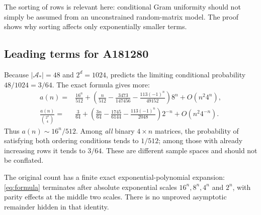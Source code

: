 \documentclass[11pt,letterpaper]{article}
\theoremstyle{definition}
\newcommand{\Astar}{\mathcal A_*}
\newcommand{\1}{\mathbf 1}
\begin{document}
The sorting of rows is relevant here: conditional Gram uniformity should not
simply be assumed from an unconstrained random-matrix model. The proof shows
why sorting affects only exponentially smaller terms.

\subsection{Leading terms for A181280}
Because $|\Astar|=48$ and $2^d=1024$,  predicts the limiting
conditional probability $48/1024=3/64$. The exact formula gives more:
\begin{align}
 a(n)={}&\frac{16^n}{512}
 +\left(\frac{n}{512}-\frac{3473}{147456}
              -\frac{113(-1)^n}{49152}\right)8^n
 +O(n^2 4^n),
 \label{eq:asympa}\\
 \frac{a(n)}{\binom{2^n}{4}}
 ={}&\frac3{64}
 +\left(\frac{3n}{64}-\frac{1745}{6144}
              -\frac{113(-1)^n}{2048}\right)2^{-n}
 +O(n^2 4^{-n}).
 \label{eq:asympprob}
\end{align}
Thus $a(n)\sim16^n/512$. Among \emph{all} binary $4\times n$ matrices, the
probability of satisfying both ordering conditions tends to $1/512$; among
those with already increasing rows it tends to $3/64$. These are different
sample spaces and should not be conflated.

The original count has a finite exact exponential-polynomial expansion:
\eqref{eq:formula} terminates after absolute exponential scales $16^n,8^n,4^n$
and $2^n$, with parity effects at the middle two scales. There is no unproved
asymptotic remainder hidden in that identity.
\end{document}
